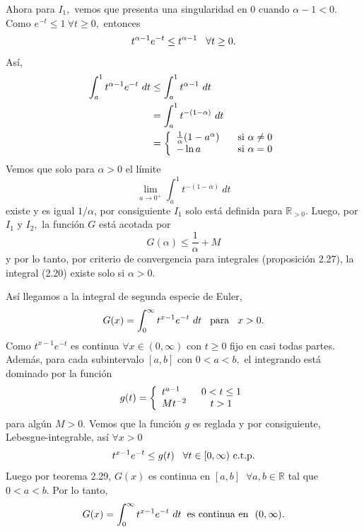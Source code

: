 Ahora para $I_1,$ vemos que presenta una singularidad en $0$ cuando $\alpha - 1 < 0.$ Como $e^{-t} \leq 1\ \forall t \geq 0,$ entonces $$t^{\alpha - 1}e^{-t} \leq t^{\alpha - 1}\hspace{0.3cm}\forall t \geq 0.$$ Así,
\begin{align*}
	\int_{a}^{1}t^{\alpha - 1}e^{-t}\ dt &\leq \int_{a}^{1}t^{\alpha - 1}\ dt \\
	&= \int_{a}^{1}t^{-(1-\alpha)}\ dt\\
	&= \left\{
	\begin{array}{lcl}
	\frac{1}{\alpha}(1-a^{\alpha})\hspace{0.3cm}&\mbox{si }\alpha \neq 0\\
	-\ln a &\mbox{si }\alpha = 0
	\end{array}
	\right.
\end{align*}
Vemos que solo para $\alpha > 0$ el límite $$\lim_{a \rightarrow 0^+}\int_{a}^{1}t^{-(1-\alpha)}\ dt$$ existe y es igual $1/\alpha$, por consiguiente $I_1$ solo está definida para $\mathbb{R}_{>0}.$ Luego, por $I_1$ y $I_2,$ la función $G$ está acotada por $$G(\alpha) \leq \frac{1}{\alpha}+M$$ y por lo tanto, por criterio de convergencia para integrales (proposición 2.27), la integral (2.20) existe solo si $\alpha > 0.$

Así llegamos a la integral de segunda especie de Euler, 
\begin{equation}
	G(x) = \int_{0}^{\infty}t^{x-1}e^{-t}\ dt\hspace{0.3cm}\textrm{para}\hspace{0.3cm}x > 0.
\end{equation}
Como $t^{x-1}e^{-t}$ es continua $\forall x \in (0,\infty)$ con $t \geq 0$ fijo en casi todas partes. Además, para cada subintervalo $[a,b]$ con $0 < a < b,$ el integrando está dominado por la función \[
g(t) = \left\{
\begin{array}{lcl}
	t^{a-1}\hspace{0.4cm} &0 < t \leq 1\\
	Mt^{-2}  &t > 1
\end{array}
\right.\]
para algún $M > 0.$ Vemos que la función $g$ es reglada y por consiguiente, Lebesgue-integrable, así $\forall x > 0$ $$t^{x-1}e^{-t} \leq g(t)\hspace{0.3cm}\forall t \in [0,\infty)\ \textrm{c.t.p.}$$ Luego por teorema 2.29, $G(x)$ es continua en $[a,b]\ $ $\forall a,b \in \mathbb{R}$ tal que $0 < a < b.$ Por lo tanto, $$G(x) = \int_{0}^{\infty}t^{x-1}e^{-t}\ dt\hspace{0.2cm}\textrm{es continua en }\ (0,\infty).$$

